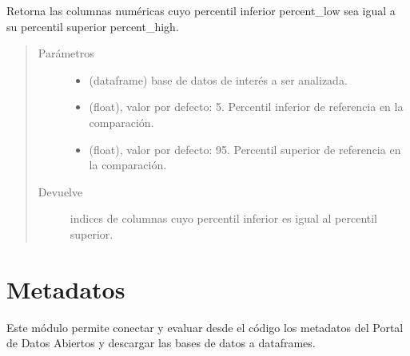 \documentclass[letterpaper,10pt,openany,spanish]{sphinxmanual}
\begin{document}

\begin{fulllineitems}
\label{\detokenize{datos:datos.var_high_low}}
Retorna las columnas numéricas cuyo percentil inferior percent\_low sea igual a su percentil superior percent\_high.
\begin{quote}\begin{description}
\item[{Parámetros}] \leavevmode\begin{itemize}
\item {} 
 \textendash{} (dataframe) base de datos de interés a ser analizada.

\item {} 
 \textendash{} (float), valor por defecto: 5. Percentil inferior de referencia en la comparación.

\item {} 
 \textendash{} (float), valor por defecto: 95. Percentil superior de referencia en la comparación.

\end{itemize}

\item[{Devuelve}] \leavevmode
indices de columnas cuyo percentil inferior es igual al percentil superior.

\end{description}\end{quote}

\end{fulllineitems}



\chapter{Metadatos}
\label{\detokenize{metadatos:metadatos}}\label{\detokenize{metadatos:id1}}\label{\detokenize{metadatos::doc}}
Este módulo permite conectar y evaluar desde el código los metadatos del Portal de Datos Abiertos y descargar las bases de datos a dataframes.
\end{document}
